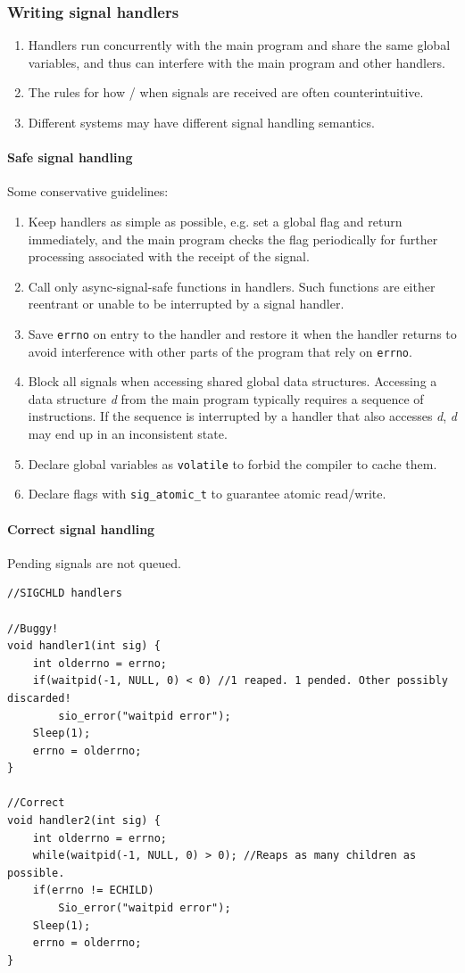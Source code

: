\subsubsection{Writing signal handlers}
\begin{enumerate}
\item Handlers run concurrently with the main program and share the same global variables, and thus can interfere with the main program and other handlers.
\item The rules for how / when signals are received are often counterintuitive.
\item Different systems may have different signal handling semantics.
\end{enumerate}
\paragraph{Safe signal handling}\label{safesignalhandling} Some conservative guidelines:
\begin{enumerate}
\item Keep handlers as simple as possible, e.g. set a global flag and return immediately, and the main program checks the flag periodically for further processing associated with the receipt of the signal.
\item Call only async-signal-safe functions in handlers. Such functions are either reentrant or unable to be interrupted by a signal handler.
\item Save \texttt{errno} on entry to the handler and restore it when the handler returns to avoid interference with other parts of the program that rely on \texttt{errno}.
\item Block all signals when accessing shared global data structures. Accessing a data structure \emph{d} from the main program typically requires a sequence of instructions. If the sequence is interrupted by a handler that also accesses \emph{d}, \emph{d} may end up in an inconsistent state.
\item Declare global variables as \texttt{volatile} to forbid the compiler to cache them.
\item Declare flags with \texttt{sig\_atomic\_t} to guarantee atomic read/write. 
\end{enumerate}
\paragraph{Correct signal handling}
Pending signals are not queued. 
\begin{lstlisting}[frame=single]
//SIGCHLD handlers

//Buggy!
void handler1(int sig) {
	int olderrno = errno;
	if(waitpid(-1, NULL, 0) < 0) //1 reaped. 1 pended. Other possibly discarded!
		sio_error("waitpid error");
	Sleep(1);
	errno = olderrno;
}

//Correct
void handler2(int sig) {
	int olderrno = errno;
	while(waitpid(-1, NULL, 0) > 0); //Reaps as many children as possible.
	if(errno != ECHILD)
		Sio_error("waitpid error");
	Sleep(1);
	errno = olderrno;
}
\end{lstlisting}
